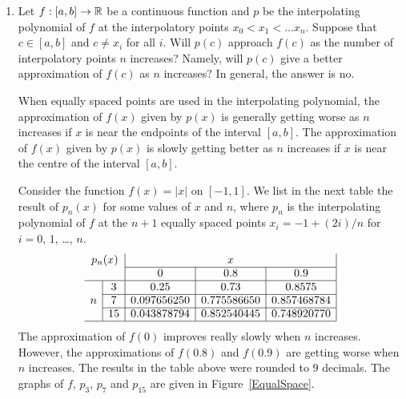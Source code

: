 \begin{rmkList} \label{appr_interp_rmk}
\begin{enumerate}
\item Let $f:[a,b] \rightarrow \mathbb{R}$ be a continuous function and $p$
be the interpolating polynomial of $f$ at the interpolatory points
$x_0 < x_1 < \ldots x_n$.  Suppose that $c \in [a,b]$ and
$c \neq x_i$ for all $i$.   Will $p(c)$ approach $f(c)$ as the number of
interpolatory points $n$ increases? Namely, will $p(c)$ give a better
approximation of $f(c)$ as $n$ increases?  In general, the answer is
no.

When equally spaced points are used in the interpolating
polynomial, the approximation of $f(x)$ given by $p(x)$ is generally
getting worse as $n$ increases if $x$ is near the endpoints of the
interval $[a,b]$.  The approximation of $f(x)$ given by $p(x)$ is 
slowly getting better as $n$ increases if $x$ is near the centre of
the interval $[a,b]$.

Consider the function $f(x) = |x|$ on $[-1,1]$.  We list in the next
table the result of $p_n(x)$ for some values of $x$ and $n$, where
$p_n$ is the interpolating polynomial of $f$ at the $n+1$ equally
spaced points $x_i = -1 + (2i)/n$ for $i=0$, $1$, \ldots , $n$.
\[
\begin{array}{c|c|c|c|c|}
\multicolumn{2}{c|}{p_n(x)} & \multicolumn{3}{c|}{x} \\
\cline{3-5}
\multicolumn{2}{c|}{} & 0 & 0.8 & 0.9 \\
\hline
& 3 & 0.25 & 0.73 & 0.8575 \\
\cline{2-5}
n & 7 & 0.097656250 & 0.775586650 & 0.857468784 \\
\cline{2-5}
 & 15 & 0.043878794 & 0.852540445 & 0.748920770 \\
\hline
\end{array}
\]
The approximation of $f(0)$ improves really slowly when $n$ increases.
However, the approximations of $f(0.8)$ and $f(0.9)$ are getting worse
when $n$ increases.  The results in the table above were
rounded to $9$ decimals.  The graphs of $f$, $p_3$, $p_7$ and $p_{15}$
are given in Figure~\ref{EqualSpace}.



\end{enumerate}
\end{rmkList}
